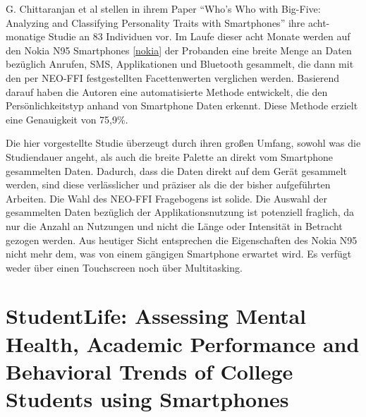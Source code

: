 G. Chittaranjan et al stellen in ihrem Paper "`Who’s Who with Big-Five: Analyzing and Classifying Personality Traits with Smartphones"' ihre acht-monatige Studie an 83 Individuen vor.
Im Laufe dieser acht Monate werden auf den Nokia N95 Smartphones \ref{nokia} der Probanden eine breite Menge an Daten bezüglich Anrufen, SMS, Applikationen und Bluetooth gesammelt, 
die dann mit den per NEO-FFI festgestellten Facettenwerten verglichen werden.
Basierend darauf haben die Autoren eine automatisierte Methode entwickelt, die den Persönlichkeitstyp anhand von Smartphone Daten erkennt.
Diese Methode erzielt eine Genauigkeit von 75,9\%.
\par
Die hier vorgestellte Studie überzeugt durch ihren großen Umfang, sowohl was die Studiendauer angeht, als auch die breite Palette an direkt vom Smartphone gesammelten Daten.
Dadurch, dass die Daten direkt auf dem Gerät gesammelt werden, sind diese verlässlicher und präziser als die der bisher aufgeführten Arbeiten.
Die Wahl des NEO-FFI Fragebogens ist solide.
Die Auswahl der gesammelten Daten bezüglich der Applikationsnutzung ist potenziell fraglich, da nur die Anzahl an Nutzungen und nicht die Länge oder Intensität in Betracht gezogen werden.
Aus heutiger Sicht entsprechen die Eigenschaften des Nokia N95 nicht mehr dem, was von einem gängigen Smartphone erwartet wird.
Es verfügt weder über einen Touchscreen noch über Multitasking.


\section*{StudentLife: Assessing Mental Health, Academic Performance and Behavioral Trends of College Students using Smartphones}

